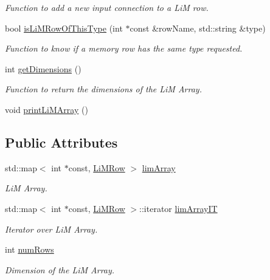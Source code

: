 \begin{DoxyCompactItemize}
\begin{DoxyCompactList}\small\item\em Function to add a new input connection to a LiM row. \end{DoxyCompactList}\item 
bool \hyperlink{classoctantis_1_1LiMArray_ac52cead51baeecbb4cefe4c9ee88ea21}{is\+Li\+M\+Row\+Of\+This\+Type} (int $\ast$const \&row\+Name, std\+::string \&type)
\begin{DoxyCompactList}\small\item\em Function to know if a memory row has the same type requested. \end{DoxyCompactList}\item 
int \hyperlink{classoctantis_1_1LiMArray_ac73a80ad67e747b43662ef149518509b}{get\+Dimensions} ()
\begin{DoxyCompactList}\small\item\em Function to return the dimensions of the LiM Array. \end{DoxyCompactList}\item 
void \hyperlink{classoctantis_1_1LiMArray_aa5bcb2c9f79bc52d594714f67b139657}{print\+Li\+M\+Array} ()
\end{DoxyCompactItemize}
\subsection*{Public Attributes}
\begin{DoxyCompactItemize}
\item 
std\+::map$<$ int $\ast$const, \hyperlink{structoctantis_1_1LiMArray_1_1LiMRow}{Li\+M\+Row} $>$ \hyperlink{classoctantis_1_1LiMArray_a09c393c212e96648f6b20bb61b68322c}{lim\+Array}
\begin{DoxyCompactList}\small\item\em LiM Array. \end{DoxyCompactList}\item 
std\+::map$<$ int $\ast$const, \hyperlink{structoctantis_1_1LiMArray_1_1LiMRow}{Li\+M\+Row} $>$\+::iterator \hyperlink{classoctantis_1_1LiMArray_aedd1e40ba6fedf5f4d8c1f38dc277f28}{lim\+Array\+IT}
\begin{DoxyCompactList}\small\item\em Iterator over LiM Array. \end{DoxyCompactList}\item 
int \hyperlink{classoctantis_1_1LiMArray_a03a3f7e32f34fde2b7776dae38a40013}{num\+Rows}
\begin{DoxyCompactList}\small\item\em Dimension of the LiM Array. \end{DoxyCompactList}\end{DoxyCompactItemize}


